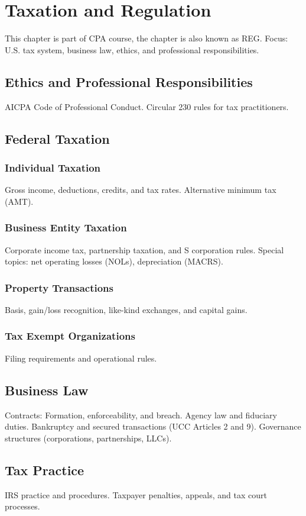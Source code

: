 \chapter{Taxation and Regulation}
This chapter is part of CPA course, the chapter is also known as REG.
Focus: U.S. tax system, business law, ethics, and professional responsibilities.


\section{Ethics and Professional Responsibilities}
AICPA Code of Professional Conduct.
Circular 230 rules for tax practitioners.


\section{Federal Taxation}
\subsection{Individual Taxation}
Gross income, deductions, credits, and tax rates.
Alternative minimum tax (AMT).
\subsection{Business Entity Taxation}
Corporate income tax, partnership taxation, and S corporation rules.
Special topics: net operating losses (NOLs), depreciation (MACRS).
\subsection{Property Transactions}
Basis, gain/loss recognition, like-kind exchanges, and capital gains.


\subsection{Tax Exempt Organizations}
Filing requirements and operational rules.


\section{Business Law}
Contracts: Formation, enforceability, and breach.
Agency law and fiduciary duties.
Bankruptcy and secured transactions (UCC Articles 2 and 9).
Governance structures (corporations, partnerships, LLCs).


\section{Tax Practice}
IRS practice and procedures.
Taxpayer penalties, appeals, and tax court processes.
